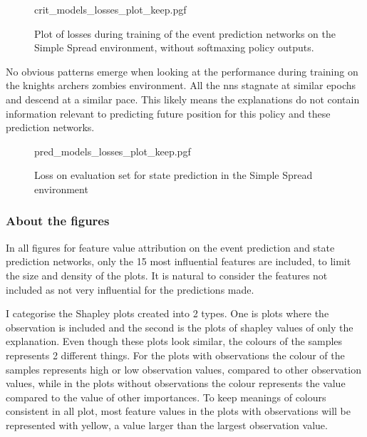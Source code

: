 \documentclass[UKenglish]{uiomasterthesis}
\begin{document}
\begin{figure}[H]
    \centering
    {crit_models_losses_plot_keep.pgf}
    \caption{Plot of losses during training of the event prediction networks on the Simple Spread environment, without softmaxing policy outputs.}
	\label{fig:crit_losses}
\end{figure}

No obvious patterns emerge when looking at the performance during training on the knights archers zombies environment. All the \acp{nn} stagnate at similar epochs and descend at a similar pace. This likely means the explanations do not contain information relevant to predicting future position for this policy and these prediction networks.

\begin{figure}[H]
    \centering
    {pred_models_losses_plot_keep.pgf}
    \caption{Loss on evaluation set for state prediction in the Simple Spread environment}
	\label{fig:pred_losses}
\end{figure}

\subsubsection{About the figures}
In all figures for feature value attribution on the event prediction and state prediction networks, only the 15 most influential features are included, to limit the size and density of the plots. It is natural to consider the features not included as not very influential for the predictions made.

I categorise the Shapley plots created into 2 types. One is plots where the observation is included and the second is the plots of shapley values of only the explanation. Even though these plots look similar, the colours of the samples represents 2 different things. For the plots with observations the colour of the samples represents high or low observation values, compared to other observation values, while in the plots without observations the colour represents the value compared to the value of other importances. To keep meanings of colours consistent in all plot, most feature values in the plots with observations will be represented with yellow, a value larger than the largest observation value.
\end{document}
